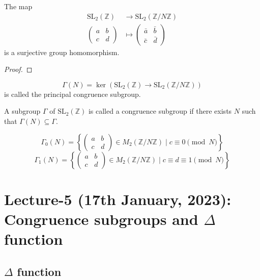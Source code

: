 \documentclass[oneside, 12pt, ]{scrbook}
\newcommand{\ZZ}{\mathbb Z}
\theoremstyle{theorem}
\begin{document}
\begin{lemma}
The map 
\begin{align*}
\mathrm{SL}_{2}(\ZZ) &\rightarrow \mathrm{SL}_{2}(\ZZ / N \ZZ) \\
\begin{pmatrix}
a & b \\ c & d
\end{pmatrix}  &\mapsto \begin{pmatrix}
\bar{a} & \bar{b} \\ \bar{c} & \bar{d}
\end{pmatrix}
\end{align*}
is a surjective group homomorphism.
\end{lemma}

\begin{proof}

\end{proof}

\begin{definition}
$$\Gamma (N) = \ker (\mathrm{SL}_{2}(\ZZ) \rightarrow \mathrm{SL}_{2}(\ZZ / N \ZZ))$$ is called the principal congruence subgroup.
\end{definition}

\begin{definition}
A subgroup $\Gamma$ of $\mathrm{SL}_{2}(\ZZ)$ is called a congruence subgroup if there exists $N$ such that $\Gamma (N) \subseteq \Gamma$.
\end{definition}

$$\Gamma_{0}(N) =\left\{ \begin{pmatrix}
a & b \\ c & d
\end{pmatrix} \in M_{2}(\ZZ / N \ZZ) \mid c\equiv 0 \pmod{N} \right\}$$
$$\Gamma_{1}(N) =\left\{ \begin{pmatrix}
a & b \\ c & d
\end{pmatrix} \in M_{2}(\ZZ / N \ZZ) \mid c\equiv d \equiv 1 \pmod{N} \right\}$$

\chapter{Lecture-5 (17th January, 2023): Congruence subgroups and $\Delta$ function}

\section{$\Delta$ function}
\end{document}
